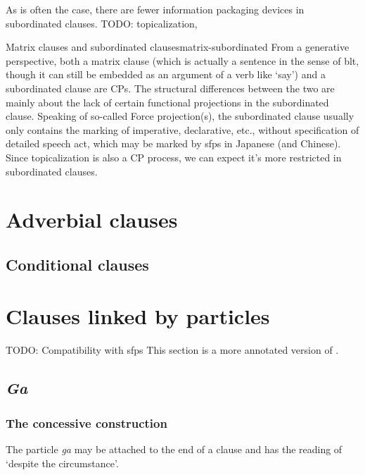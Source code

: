 \documentclass[UTF8, a4paper, oneside, scheme=plain]{ctexrep}
\newcommand*{\citesec}[1]{\S~{#1}}
\newcommand{\corpus}[1]{\emph{#1}}
\newcommand{\translate}[1]{`#1'}
\begin{document}
As is often the case, there are fewer information packaging devices in subordinated clauses.
TODO: topicalization, 

\begin{theorybox}{Matrix clauses and subordinated clauses}{matrix-subordinated}
    From a generative perspective, both a matrix clause 
    (which is actually a sentence in the sense of \acs{blt}, 
    though it can still be embedded as an argument of a verb like \translate{say})
    and a subordinated clause are CPs.
    The structural differences between the two 
    are mainly about the lack of certain functional projections in the subordinated clause.
    Speaking of so-called Force projection(s),
    the subordinated clause usually only contains the marking of 
    imperative, declarative, etc.,
    without specification of detailed speech act,
    which may be marked by \ac{sfp}s in Japanese (and Chinese).
    Since topicalization is also a CP process,
    we can expect it's more restricted in subordinated clauses.
\end{theorybox}

\section{Adverbial clauses}

\subsection{Conditional clauses}

\section{Clauses linked by particles}\label{sec:particle-linking-clause}

TODO: Compatibility with \ac{sfp}s
This section is a more annotated version of \citet[\citesec{6.3}]{akiyama2012japanese}.

\subsection{\corpus{Ga}}

\subsubsection{The concessive construction}

The particle \corpus{ga} may be attached to the end of a clause 
and has the reading of \translate{despite the circumstance}.
\end{document}
